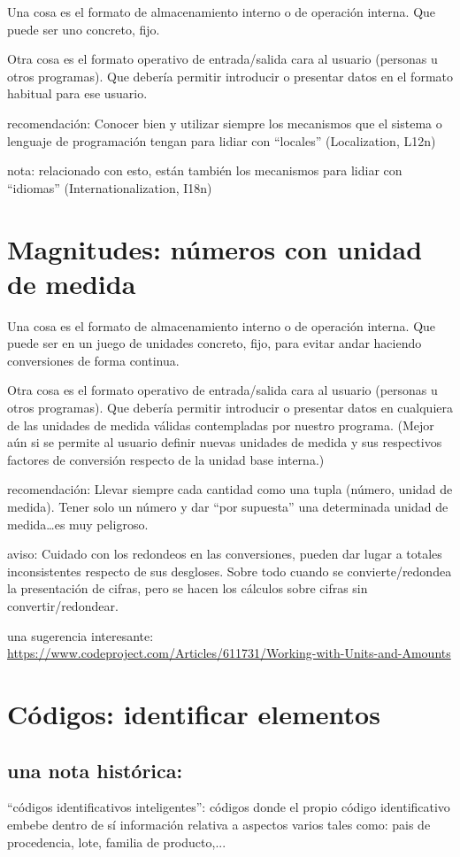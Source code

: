 \documentclass[spanish,12pt,a4paper,final,oneside]{book}
\begin{document}
Una cosa es el formato de almacenamiento interno o de operación interna. Que puede ser uno concreto, fijo.

Otra cosa es el formato operativo de entrada/salida cara al usuario (personas u otros programas). Que debería permitir introducir o presentar datos en el formato habitual para ese usuario.

recomendación: Conocer bien y utilizar siempre los mecanismos que el sistema o lenguaje de programación tengan para lidiar con ``locales'' (Localization, L12n)

nota: relacionado con esto, están también los mecanismos para lidiar con ``idiomas''  (Internationalization, I18n)


\section{Magnitudes: números con unidad de medida}

Una cosa es el formato de almacenamiento interno o de operación interna. Que puede ser en un juego de unidades concreto, fijo, para evitar andar haciendo conversiones de forma continua.

Otra cosa es el formato operativo de entrada/salida cara al usuario (personas u otros programas). Que debería permitir introducir o presentar datos en cualquiera de las unidades de medida válidas contempladas por nuestro programa. (Mejor aún si se permite al usuario definir nuevas unidades de medida y sus respectivos factores de conversión respecto de la unidad base interna.)

recomendación: Llevar siempre cada cantidad como una tupla (número, unidad de medida). Tener solo un número y dar ``por supuesta'' una determinada unidad de medida\ldots es muy peligroso.

aviso: Cuidado con los redondeos en las conversiones, pueden dar lugar a totales inconsistentes respecto de sus desgloses. Sobre todo cuando se convierte/redondea la presentación de cifras, pero se hacen los cálculos sobre cifras sin convertir/redondear. 

una sugerencia interesante: \url{https://www.codeproject.com/Articles/611731/Working-with-Units-and-Amounts}


\section{Códigos: identificar elementos}

\subsection{una nota histórica:}
``códigos identificativos inteligentes'': códigos donde el propio código identificativo embebe dentro de sí información relativa a aspectos varios tales como: pais de procedencia, lote, familia de producto,...
\end{document}

